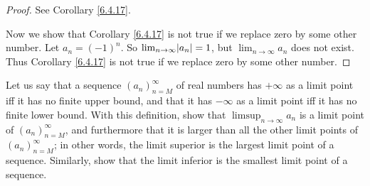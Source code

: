 \begin{proof}
    See Corollary \ref{6.4.17}.

    Now we show that Corollary \ref{6.4.17} is not true if we replace zero by some other number.
    Let \(a_n = (-1)^n\).
    So \(\lim_{n \to \infty} \abs*{a_n} = 1\), but \(\lim_{n \to \infty} a_n\) does not exist.
    Thus Corollary \ref{6.4.17} is not true if we replace zero by some other number.
\end{proof}

\begin{exercise}\label{ex 6.4.8}
    Let us say that a sequence \((a_n)_{n = M}^\infty\) of real numbers has \(+\infty\) as a limit point iff it has no finite upper bound, and that it has \(-\infty\) as a limit point iff it has no finite lower bound.
    With this definition, show that \(\limsup_{n \to \infty} a_n\) is a limit point of \((a_n)_{n = M}^\infty\), and furthermore that it is larger than all the other limit points of \((a_n)_{n = M}^\infty\);
    in other words, the limit superior is the largest limit point of a sequence.
    Similarly, show that the limit inferior is the smallest limit point of a sequence.
\end{exercise}

